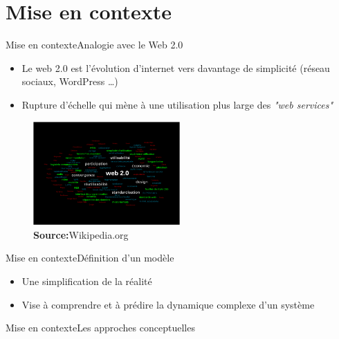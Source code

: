 \documentclass{eecslides}
\begin{document}
	\section{Mise en contexte}

	\begin{frame}{Mise en contexte}{Analogie avec le Web 2.0} 

	\begin{itemize}
		\item Le \alert{web 2.0} est l'évolution d'internet vers davantage de simplicité (réseau sociaux, WordPress \dots)
		\item Rupture d'échelle qui mène à une utilisation plus large des \textit{"web services"}
	\end{itemize}

		\begin{figure}
			\includegraphics[width=0.5\textwidth]{800px-Carte_web_2.png}
	         		\caption*{\scriptsize\textbf{Source:}Wikipedia.org} 
		\end{figure}

	\end{frame}

	\begin{frame}{Mise en contexte}{Définition d'un modèle}
	    
		\begin{itemize}
			\item Une simplification de la réalité
			\item Vise à comprendre et à prédire la dynamique complexe d'un système
		\end{itemize}

	
	\end{frame}

	\begin{frame}{Mise en contexte}{Les approches conceptuelles} 
		
	
	\end{frame}
\end{document}
